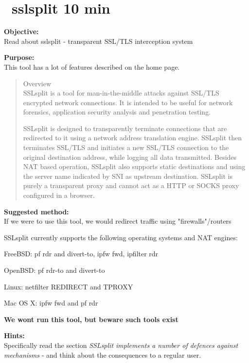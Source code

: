 \documentclass[a4paper,11pt,notitlepage]{report}
\begin{document}
\chapter{\faInfoCircle\ sslsplit 10 min}
\label{ex:sslsplit}

{\bf Objective:}\\
Read about sslsplit 
- transparent SSL/TLS interception system

{\bf Purpose:}\\
This tool has a lot of features described on the home page.

\begin{quote}\small
Overview\\
SSLsplit is a tool for man-in-the-middle attacks against SSL/TLS encrypted network connections. It is intended to be useful for network forensics, application security analysis and penetration testing.

SSLsplit is designed to transparently terminate connections that are redirected to it using a network address translation engine. SSLsplit then terminates SSL/TLS and initiates a new SSL/TLS connection to the original destination address, while logging all data transmitted. Besides NAT based operation, SSLsplit also supports static destinations and using the server name indicated by SNI as upstream destination. SSLsplit is purely a transparent proxy and cannot act as a HTTP or SOCKS proxy configured in a browser.
\end{quote}

{\bf Suggested method:}\\
If we were to use this tool, we would redirect traffic using "firewalls"/routers

\begin{list2}
\item SSLsplit currently supports the following operating systems and NAT engines:
\item FreeBSD: pf rdr and divert-to, ipfw fwd, ipfilter rdr
\item OpenBSD: pf rdr-to and divert-to
\item Linux: netfilter REDIRECT and TPROXY
\item Mac OS X: ipfw fwd and pf rdr
\end{list2}

{\bf We wont run this tool, but beware such tools exist}

{\bf Hints:}\\
Specifically read the section \emph{SSLsplit implements a number of defences against mechanisms} - and think about the consequences to a regular user.
\end{document}

